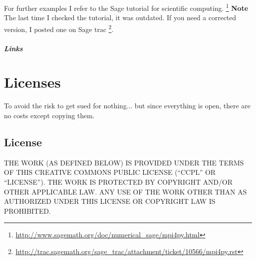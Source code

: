 \documentclass[letterpaper,10pt,english]{manual}
\begin{document}
For further examples I refer to the Sage tutorial for scientific
computing.  \footnote{
\href{http://www.sagemath.org/doc/numerical\_sage/mpi4py.html}{http://www.sagemath.org/doc/numerical\_sage/mpi4py.html}
}
\textbf{Note} The last time I checked the tutorial, it was outdated.
If you need a corrected version, I posted one on Sage trac \footnote{
\href{http://trac.sagemath.org/sage\_trac/attachment/ticket/10566/mpi4py.rst}{http://trac.sagemath.org/sage\_trac/attachment/ticket/10566/mpi4py.rst}
}.
\paragraph{Links}

\resetcurrentobjects
\hypertarget{--doc-License}{}

\hypertarget{license-ref}{}\chapter{Licenses}

To avoid the risk to get sued for nothing... but since everything is
open, there are no costs except copying them.


\section{License}

THE WORK (AS DEFINED BELOW) IS PROVIDED UNDER THE TERMS OF THIS CREATIVE COMMONS PUBLIC LICENSE (``CCPL'' OR ``LICENSE''). THE WORK IS PROTECTED BY COPYRIGHT AND/OR OTHER APPLICABLE LAW. ANY USE OF THE WORK OTHER THAN AS AUTHORIZED UNDER THIS LICENSE OR COPYRIGHT LAW IS PROHIBITED.
\end{document}
